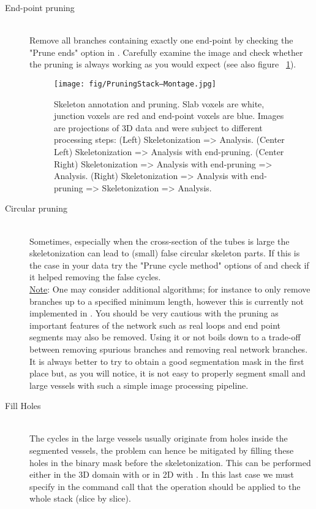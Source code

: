 \begin{description}
\item[End-point pruning]\hfill\\
Remove all branches containing exactly one end-point by checking the "Prune ends" option in . Carefully examine the image and check whether the pruning is always working as you would expect (see also figure ~\ref{fig:prune}).
\begin{figure}[h!]
  \caption{Skeleton annotation and pruning. Slab voxels are white, junction voxels are red and end-point voxels are blue. Images are projections of 3D data and were subject to different processing steps: (Left) Skeletonization => Analysis. (Center Left) Skeletonization => Analysis with end-pruning. (Center Right) Skeletonization => Analysis with end-pruning => Analysis. (Right) Skeletonization => Analysis with end-pruning => Skeletonization => Analysis.} \label{fig:prune}
  \centering
    \texttt{[image: fig/PruningStack--Montage.jpg]}
\end{figure}
\item[Circular pruning]\hfill\\
Sometimes, especially when the cross-section of the tubes is large the skeletonization can lead to (small) false circular skeleton parts. If this is the case in your data try the "Prune cycle method" options of  and check if it  helped removing the false cycles.\\

\underline{Note}: One may consider additional algorithms; for instance to only remove branches up to a specified minimum length, however this is currently not implemented in . You should be very cautious with the pruning as important features of the network such as real loops and end point segments may also be removed. Using it or not boils down to a trade-off between removing spurious branches and removing real network branches. It is always better to try to obtain a good segmentation mask in the first place but, as you will notice, it is not easy to properly segment small and large vessels with such a simple image processing pipeline.

\item[Fill Holes]\hfill\\
The cycles in the large vessels usually originate from holes inside the segmented vessels, the problem can hence be mitigated by filling these holes in the binary mask before the skeletonization. This can be performed either in the 3D domain with  or in 2D with . In this last case we must specify in the command call that the operation should be applied to the whole stack (slice by slice). 


\end{description}
